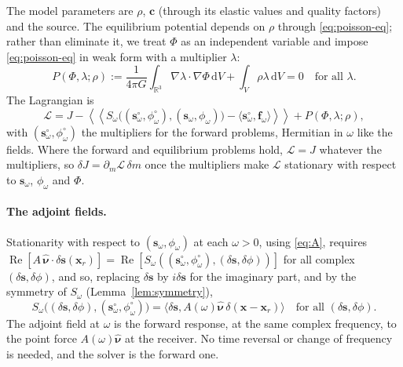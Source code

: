 \documentclass[11pt,a4paper]{article}
\newcommand{\bs}{\mathbf{s}}
\newcommand{\bc}{\mathbf{c}}
\newcommand{\bnu}{\hat{\bm{\nu}}}
\newcommand{\bx}{\mathbf{x}}
\newcommand{\sd}{\mathbf{s}^\circ}
\newcommand{\pd}{\phi^\circ}
\renewcommand{\Re}{\operatorname{Re}}
\newcommand{\dd}{\,\mathrm{d}}
\newcommand{\Lag}{\mathcal{L}}
\theoremstyle{remark}
\begin{document}
The model parameters are $\rho$, $\bc$ (through its elastic values and
quality factors) and the source. The equilibrium potential depends on
$\rho$ through \eqref{eq:poisson-eq}; rather than eliminate it, we treat
$\Phi$ as an independent variable and impose \eqref{eq:poisson-eq} in weak
form with a multiplier $\lambda$:
\begin{equation}
  P(\Phi,\lambda;\rho) := \frac{1}{4\pi G}\int_{\mathbb{R}^3}\nabla\lambda
  \cdot\nabla\Phi\dd V + \int_V\rho\lambda\dd V = 0 \quad\text{for all }
  \lambda. \label{eq:P}
\end{equation}
The Lagrangian is
\begin{equation}
  \Lag = J - \left\langle\!\!\left\langle
  S_\omega\big((\sd_\omega,\pd_\omega),(\bs_\omega,\phi_\omega)\big)
  - \langle\sd_\omega,\mathbf{f}_\omega\rangle\right\rangle\!\!\right\rangle
  + P(\Phi,\lambda;\rho), \label{eq:L}
\end{equation}
with $(\sd_\omega,\pd_\omega)$ the multipliers for the forward problems,
Hermitian in $\omega$ like the fields. Where the forward and equilibrium
problems hold, $\Lag=J$ whatever the multipliers, so $\delta J =
\partial_m\Lag\,\delta m$ once the multipliers make $\Lag$ stationary with
respect to $\bs_\omega$, $\phi_\omega$ and $\Phi$.

\paragraph{The adjoint fields.}
Stationarity with respect to $(\bs_\omega,\phi_\omega)$ at each $\omega>0$,
using \eqref{eq:A}, requires $\Re[A\,\bnu\cdot\delta\bs(\bx_r)] =
\Re[S_\omega((\sd_\omega,\pd_\omega),(\delta\bs,\delta\phi))]$ for all
complex $(\delta\bs,\delta\phi)$, and so, replacing $\delta\bs$ by
$i\delta\bs$ for the imaginary part, and by the symmetry of $S_\omega$
(Lemma~\ref{lem:symmetry}),
\begin{equation}
  S_\omega\big((\delta\bs,\delta\phi),(\sd_\omega,\pd_\omega)\big) =
  \langle\delta\bs, A(\omega)\bnu\,\delta(\bx-\bx_r)\rangle
  \quad\text{for all } (\delta\bs,\delta\phi). \label{eq:adjoint}
\end{equation}
The adjoint field at $\omega$ is the forward response, at the same complex
frequency, to the point force $A(\omega)\bnu$ at the receiver. No time
reversal or change of frequency is needed, and the solver is the forward
one.
\end{document}
